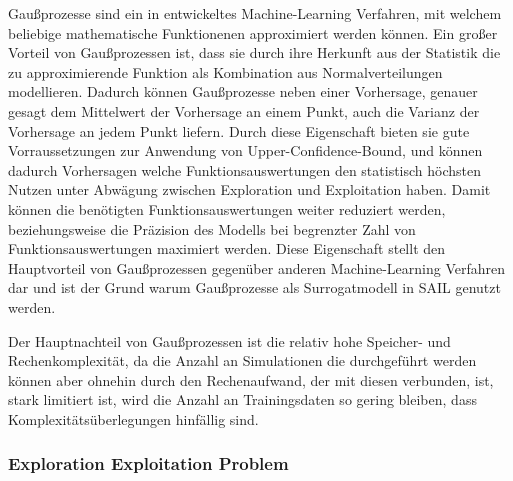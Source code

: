 Gaußprozesse sind ein in \cite{Rasmussen.2008} entwickeltes Machine-Learning Verfahren, mit welchem beliebige mathematische Funktionenen approximiert werden können. 
Ein großer Vorteil von Gaußprozessen ist, dass sie durch ihre Herkunft aus der Statistik die zu approximierende Funktion als Kombination aus Normalverteilungen modellieren.
Dadurch können Gaußprozesse neben einer Vorhersage, genauer gesagt dem Mittelwert der Vorhersage an einem Punkt, auch die Varianz der Vorhersage an jedem Punkt liefern.
Durch diese Eigenschaft bieten sie gute Vorraussetzungen zur Anwendung von Upper-Confidence-Bound, und können dadurch Vorhersagen welche Funktionsauswertungen den statistisch höchsten Nutzen unter Abwägung zwischen Exploration und Exploitation haben.
Damit können die benötigten Funktionsauswertungen weiter reduziert werden, beziehungsweise die Präzision des Modells bei begrenzter Zahl von Funktionsauswertungen maximiert werden.
Diese Eigenschaft stellt den Hauptvorteil von Gaußprozessen gegenüber anderen Machine-Learning Verfahren dar und ist der Grund warum Gaußprozesse als Surrogatmodell in SAIL genutzt werden.



Der Hauptnachteil von Gaußprozessen ist die relativ hohe Speicher- und Rechenkomplexität, da die Anzahl an Simulationen die durchgeführt werden können aber ohnehin durch den Rechenaufwand, der mit diesen verbunden, ist, stark limitiert ist, wird die Anzahl an Trainingsdaten so gering bleiben, dass Komplexitätsüberlegungen hinfällig sind.

\subsubsection{Exploration Exploitation Problem}

